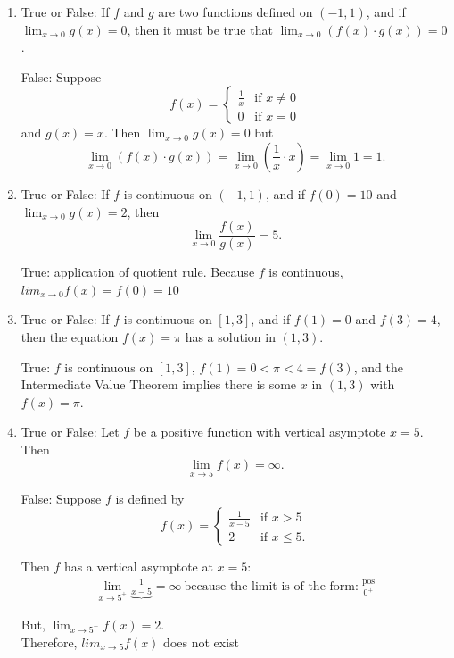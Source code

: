 \documentclass[nooutcomes,handout]{ximera}
\begin{document}
\begin{problem}
	\begin{enumerate}
	\item  True or False: If $f$ and $g$ are two functions defined on $(-1, 1)$, and if $\displaystyle \lim_{x \to 0} g(x) = 0$, then it must be true that $\displaystyle \lim_{x \to 0} (f(x) \cdot g(x)) = 0$.
  \begin{freeResponse}
    False: Suppose 
    \[
      f(x) =
      \begin{cases}
        \frac{1}{x} & \mbox{if $x \ne 0$}\\
        0 & \mbox{if $x = 0$}
      \end{cases}
    \]
    and $g(x) = x$.
    Then $\lim_{x \to 0} g(x) = 0$ but
    \[
      \lim_{x \to 0} (f(x) \cdot g(x)) = \lim_{x \to 0} \left( \frac{1}{x} \cdot x \right) = \lim_{x \to 0} 1 = 1.
    \]
  \end{freeResponse}

  \item True or False: If $f$ is continuous on $(-1, 1)$, and if $f(0) = 10$ and $\displaystyle \lim_{x \to 0} g(x) = 2$, then
  \[
    \lim_{x \to 0} \frac{f(x)}{g(x)} = 5.
  \]
  \begin{freeResponse}
    True: application of quotient rule.  Because $f$ is continuous, $lim_{x \to 0} f(x)=f(0)=10$
  \end{freeResponse}

	\item  True or False: If $f$ is continuous on $[1, 3]$, and if $f(1) = 0$ and $f(3) = 4$, then the equation $f(x) = \pi$ has a solution in $(1, 3)$.
  \begin{freeResponse}
    True: $f$ is continuous on $[1, 3]$, $f(1) = 0 < \pi < 4 = f(3)$, and the Intermediate Value Theorem implies there is some $x$ in $(1, 3)$ with $f(x) = \pi$.
  \end{freeResponse}

  \item True or False: Let $f$ be a positive function with vertical asymptote $x = 5$. Then
  \[
    \lim_{x \to 5} f(x) = \infty.
  \]
  \begin{freeResponse}
    False: Suppose $f$ is defined by
    \[
      f(x) =
      \begin{cases}
        \frac{1}{x - 5} & \mbox{if $x > 5$}\\
        2 & \mbox{if $x \le 5$}.
      \end{cases}
    \]
    
    Then $f$ has a vertical asymptote at $x = 5$:
    \begin{align*}
      \lim_{x \to 5^+} \underbrace{\frac{1}{x-5}} = \infty\ \text{because the limit is of the form:}\ \frac{\text{pos}}{0^+}
    \end{align*}

    But, $\displaystyle \lim_{x \to 5^-} f(x) = 2$.\\
	Therefore, $lim_{x \to 5} f(x)$ does not exist

  \end{freeResponse}
\end{enumerate}
\end{problem}
\end{document}
